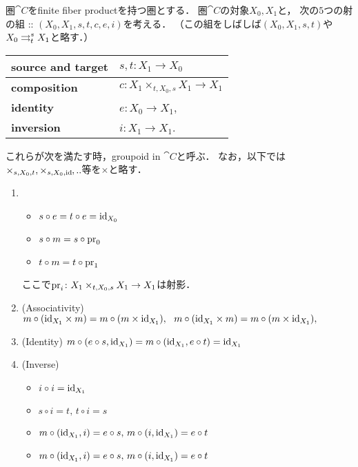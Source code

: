 \begin{Def}
    圏$\cat{C}$をfinite fiber productを持つ圏とする．
    圏$\cat{C}$の対象$X_0, X_1$と，
    次の$5$つの射の組 :: $(X_0,X_1, s,t,c,e,i)$を考える．
    （この組をしばしば$(X_0,X_1,s,t)$や$X_0 \parto{s}{t} X_1$と略す．）
    \begin{center}
    \begin{tabular}{ll}
        \textbf{source and target} & $s,t \colon X_1 \to X_0$ \\ \hline
        \textbf{composition}       & $c \colon X_1 \times_{t,X_0,s} X_1 \to X_1$ \\ \hline
        \textbf{identity}          & $e \colon X_0 \to X_1$, \\ \hline
        \textbf{inversion}         & $i \colon X_1 \to X_1$.
    \end{tabular}
    \end{center}

    これらが次を満たす時，groupoid in $\cat{C}$と呼ぶ．
    なお，以下では$\times_{s,X_0, t}, \times_{s, X_0, \id},..$等を$\times$と略す．
    \begin{enumerate}[label=(\Alph*)]
    \item 
        \begin{itemize}
            \item $s\circ e=t\circ e=\id[X_0]$
            \item $s\circ m=s\circ \pr_{0}$
            \item $t\circ m=t\circ \pr_{1}$
        \end{itemize}
        ここで$\pr_i \colon X_1\times _{t,X_0,s} X_1\to X_1$は射影．
    \item
        (Associativity)
        $m\circ (\id[X_1]\times m)=m\circ (m\times \id[X_1]),\ \ 
        m\circ (\id[X_1]\times m)=m\circ (m\times \id[X_1]),$
    \item
        (Identity)
        $m\circ (e\circ s,\id[X_1])=m\circ (\id[X_1],e\circ t)=\id[X_1]$
    \item
        (Inverse)
        \begin{itemize}
            \item $i\circ i=\id[X_1]$
            \item $s\circ i=t,\,t\circ i=s$
            \item $m\circ (\id[X_1],i)=e\circ s,\,m\circ (i,\id[X_1])=e\circ t$
            \item $m\circ (\id[X_1],i)=e\circ s,\,m\circ (i,\id[X_1])=e\circ t$
        \end{itemize}
    \end{enumerate}
\end{Def}

